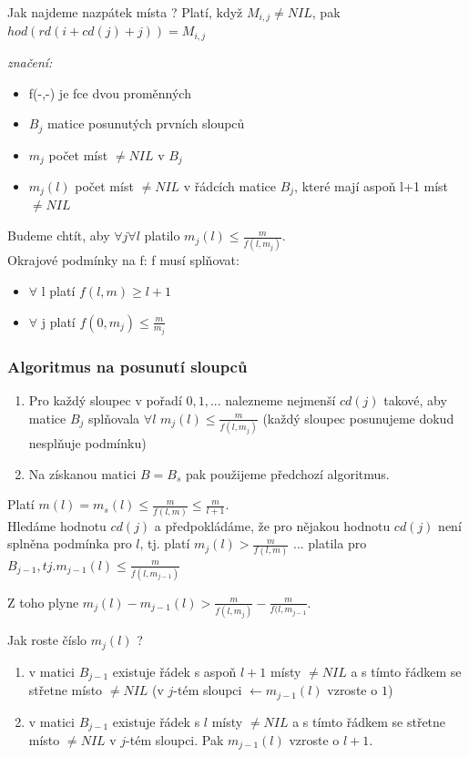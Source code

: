 Jak najdeme nazpátek místa ? Platí, když $M_{i,j} \neq NIL$, pak
$hod(rd(i+cd(j)+j)) = M_{i,j}$

\par
{\em značení:} 
\begin{itemize}
\item f(-,-) je fce dvou proměnných 
\item $B_j$ matice posunutých prvních sloupců 
\item $m_j$ počet míst $\neq NIL$ v $B_j$ 
\item $m_j(l)$ počet míst $\neq NIL$ v řádcích matice $B_j$, které mají aspoň l+1 míst $\neq NIL$
\end{itemize}
\par

Budeme chtít, aby $\forall j \forall l$ platilo $m_j(l) \leq
\frac{m}{f(l,m_j)}$. \\
Okrajové podmínky na f: f musí splňovat:
\begin{itemize}
\item $\forall$ l platí $f(l,m) \geq l+1$
\item$\forall$ j platí $f(0,m_j) \leq \frac{m}{m_j}$
\end{itemize}

\subsubsection{Algoritmus na posunutí sloupců}

\begin{enumerate}
\item Pro každý sloupec v pořadí $0,1,...$ nalezneme nejmenší $cd(j)$ 
takové, aby matice $B_j$ splňovala 
$\forall l$ $m_j(l) \leq \frac{m}{f(l,m_j)}$
(každý sloupec posunujeme dokud nesplňuje podmínku) 
\item Na získanou matici $B = B_s$ pak použijeme předchozí algoritmus. 
\end{enumerate}

Platí $m(l) = m_s(l) \leq \frac{m}{f(l,m)} \leq \frac{m}{l+1}$. \\
Hledáme hodnotu $cd(j)$ a předpokládáme, že pro nějakou hodnotu 
$cd(j)$ není splněna
podmínka pro $l$, tj. platí $m_j(l) > \frac{m}{f(l,m)}$
... platila pro $B_{j-1}, tj. m_{j-1}(l) \leq \frac{m}{f(l,m_{j-1})}$
\par
Z toho plyne $m_j(l) - m_{j-1}(l) > \frac{m}{f(l,m_j)} -
\frac{m}{f(l,m_{j-1}}$.
\par

Jak roste číslo $m_j(l)$ ? 
\begin{enumerate}
\item v matici $B_{j-1}$ existuje řádek s aspoň $l+1$ místy $\neq NIL$ 
a s tímto řádkem se střetne místo $\neq NIL$ (v $j$-tém sloupci 
$\leftarrow m_{j-1}(l)$
vzroste o $1$)
\item v matici $B_{j-1}$ existuje řádek s $l$ místy $\neq NIL$ a s tímto
řádkem se střetne místo $\neq NIL$ v $j$-tém sloupci. Pak $m_{j-1}(l)$
vzroste o $l+1$.
\end{enumerate}

